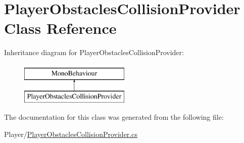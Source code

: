 \hypertarget{class_player_obstacles_collision_provider}{}\section{Player\+Obstacles\+Collision\+Provider Class Reference}
\label{class_player_obstacles_collision_provider}
Inheritance diagram for Player\+Obstacles\+Collision\+Provider\+:\begin{figure}[H]
\begin{center}
\leavevmode
\includegraphics[height=2.000000cm]{class_player_obstacles_collision_provider}
\end{center}
\end{figure}


The documentation for this class was generated from the following file\+:\begin{DoxyCompactItemize}
\item 
Player/\mbox{\hyperlink{_player_obstacles_collision_provider_8cs}{Player\+Obstacles\+Collision\+Provider.\+cs}}\end{DoxyCompactItemize}
